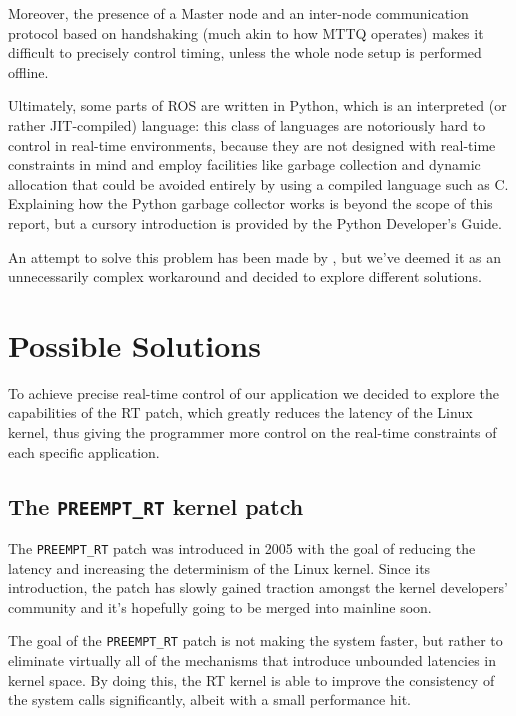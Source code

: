 \documentclass[a4paper,12pt]{report}
\begin{document}
Moreover, the presence of a Master node and an inter-node communication protocol based on handshaking (much akin to how MTTQ operates) makes it difficult to precisely control timing, unless the whole node setup is performed offline.

Ultimately, some parts of ROS are written in Python\cite{roswiki-rospy}, which is an interpreted (or rather JIT-compiled) language: this class of languages are notoriously hard to control in real-time environments, because they are not designed with real-time constraints in mind and employ facilities like garbage collection and dynamic allocation that could be avoided entirely by using a compiled language such as C. Explaining how the Python garbage collector works is beyond the scope of this report, but a cursory introduction is provided by the Python Developer's Guide\cite{python-devguide-gc}.

An attempt to solve this problem has been made by \textcite{rt-ros-approach}, but we've deemed it as an unnecessarily complex workaround and decided to explore different solutions.

\section{Possible Solutions}

To achieve precise real-time control of our application we decided to explore the capabilities of the RT patch, which greatly reduces the latency of the Linux kernel, thus giving the programmer more control on the real-time constraints of each specific application.

\subsection{The \texttt{PREEMPT\_RT} kernel patch}

The \texttt{PREEMPT\_RT} patch was introduced in 2005 with the goal of reducing the latency and increasing the determinism of the Linux kernel. Since its introduction, the patch has slowly gained traction amongst the kernel developers' community and it's hopefully going to be merged into mainline soon\cite{lwn-rt-future}.

The goal of the \texttt{PREEMPT\_RT} patch is not making the system faster, but rather to eliminate virtually all of the mechanisms that introduce unbounded latencies in kernel space. By doing this, the RT kernel is able to improve the consistency of the system calls significantly\cite{dmoceri-benchmarking-rtlinux}, albeit with a small performance hit.
\end{document}
